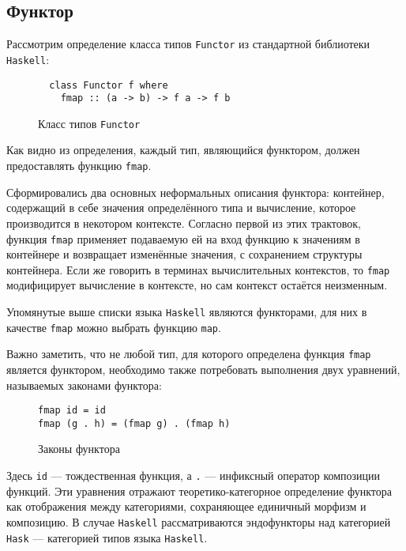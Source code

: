 \subsection{Функтор}

Рассмотрим определение класса типов \lstinline{Functor} из стандартной 
библиотеки \lstinline{Haskell}:

\begin{figure}[h]
\begin{lstlisting}
  class Functor f where
    fmap :: (a -> b) -> f a -> f b
\end{lstlisting}
\caption{Класс типов \lstinline{Functor}}
\label{listing:Functor}
\end{figure}

Как видно из определения, каждый тип, являющийся функтором, должен предоставлять
функцию \lstinline{fmap}.

Сформировались два основных неформальных описания функтора: контейнер, 
содержащий в себе значения определённого типа и вычисление, которое производится
в некотором контексте. Согласно первой из этих трактовок, функция 
\lstinline{fmap} применяет подаваемую ей на вход функцию к значениям в 
контейнере и возвращает изменённые значения, с сохранением структуры контейнера.
Если же говорить в терминах вычислительных контекстов, то \lstinline{fmap}
модифицирует вычисление в контексте, но сам контекст остаётся неизменным.

Упомянутые выше списки языка \lstinline{Haskell} являются функторами, для них в
качестве \lstinline{fmap} можно выбрать функцию \lstinline{map}.

Важно заметить, что не любой тип, для которого определена функция 
\lstinline{fmap} является функтором, необходимо также потребовать выполнения 
двух уравнений, называемых законами функтора:

\begin{figure}[h]
\begin{lstlisting}
fmap id = id
fmap (g . h) = (fmap g) . (fmap h)
\end{lstlisting}
\caption{Законы функтора}
\label{listing:FunctorLaws}
\end{figure}

Здесь \lstinline{id} --- тождественная функция, а \lstinline{.} --- инфиксный
оператор композиции функций. Эти уравнения отражают теоретико-категорное 
определение функтора как отображения между категориями, сохраняющее единичный 
морфизм и композицию. В случае \lstinline{Haskell} рассматриваются эндофункторы 
над категорией \lstinline{Hask} --- категорией типов языка \lstinline{Haskell}.

